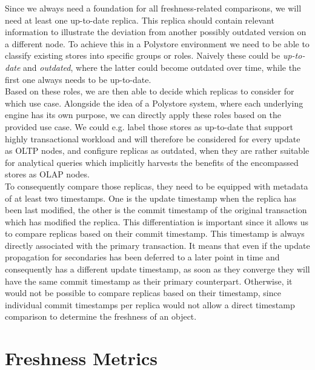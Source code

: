 Since we always need a foundation for all freshness-related comparisons, we will need at least one up-to-date replica. 
This replica should contain relevant information to illustrate the deviation from another possibly outdated version on a different node.
To achieve this in a Polystore environment we need to be able to classify existing stores into specific groups or roles.
Naively these could be \emph{up-to-date} and \emph{outdated}, where the latter could become outdated over time, while the first one always needs to be up-to-date. \\
Based on these roles, we are then able to decide which replicas to consider for which use case.
Alongside the idea of a Polystore system, where each underlying engine has its own purpose, we can directly apply these roles 
based on the provided use case. We could e.g. label those stores as up-to-date that support highly transactional workload and will therefore be considered for every update as OLTP nodes,
and configure replicas as outdated, when they are rather suitable for analytical queries which implicitly harvests the benefits of the encompassed stores as OLAP nodes. \\
To consequently compare those replicas, they need to be equipped with metadata of at least two timestamps. 
One is the update timestamp when the replica has been last modified,
the other is the commit timestamp of the original transaction which has modified the replica.
This differentiation is important since it allows us to compare replicas based on their commit timestamp. This timestamp is always directly associated with the primary transaction.
It means that even if the update propagation for secondaries has been deferred to a later point in time and consequently has a different update timestamp, 
as soon as they converge they will have the same commit timestamp as their primary counterpart.
Otherwise, it would not be possible to compare replicas based on their timestamp, since individual commit timestamps per replica would not allow a direct timestamp comparison 
to determine the freshness of an object.



\section{Freshness Metrics}
\label{sec:freshne_metrics}

